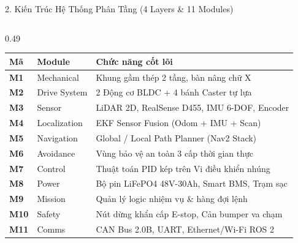 \documentclass[aspectratio=169,9pt]{beamer}
\begin{document}
\begin{frame}{2. Kiến Trúc Hệ Thống Phân Tầng (4 Layers \& 11 Modules)}
\begin{columns}[T,onlytextwidth]
    \begin{column}{0.49\textwidth}
      \begin{tcolorbox}[titlepanel,title=Phân rã 11 Module hệ thống (M1--M11)]
        {\fontsize{6.6}{7.8}\selectfont
        \begin{tabularx}{\linewidth}{@{}llX@{}}
          \toprule
          \textbf{Mã} & \textbf{Module} & \textbf{Chức năng cốt lõi} \\
          \midrule
          \textbf{M1} & Mechanical & Khung gầm thép 2 tầng, bàn nâng chữ X \\
          \textbf{M2} & Drive System & 2 Động cơ BLDC + 4 bánh Caster tự lựa \\
          \textbf{M3} & Sensor & LiDAR 2D, RealSense D455, IMU 6-DOF, Encoder \\
          \textbf{M4} & Localization & EKF Sensor Fusion (Odom + IMU + Scan) \\
          \textbf{M5} & Navigation & Global / Local Path Planner (Nav2 Stack) \\
          \textbf{M6} & Avoidance & Vùng bảo vệ an toàn 3 cấp thời gian thực \\
          \textbf{M7} & Control & Thuật toán PID kép trên Vi điều khiển nhúng \\
          \textbf{M8} & Power & Bộ pin LiFePO4 48V-30Ah, Smart BMS, Trạm sạc \\
          \textbf{M9} & Mission & Quản lý logic nhiệm vụ \& hàng đợi lệnh \\
          \textbf{M10} & Safety & Nút dừng khẩn cấp E-stop, Cản bumper va chạm \\
          \textbf{M11} & Comms & CAN Bus 2.0B, UART, Ethernet/Wi-Fi ROS 2 \\
          \bottomrule
        \end{tabularx}}
      \end{tcolorbox}
    \end{column}
  \end{columns}
\end{frame}
\end{document}
